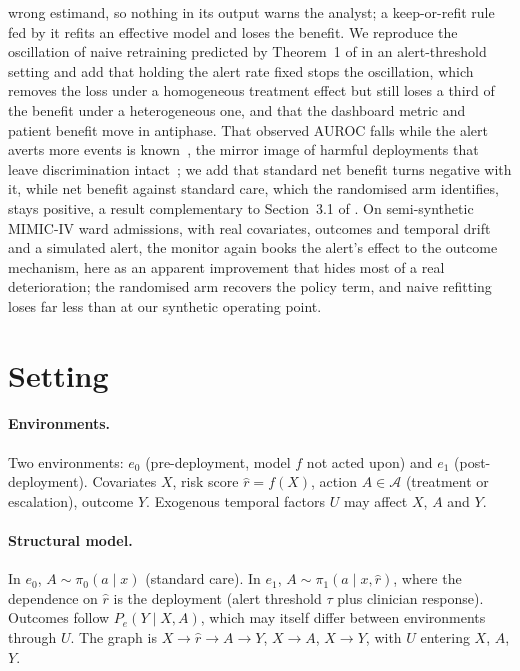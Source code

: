 \documentclass[letterpaper]{article} %
\newcommand{\rhat}{\hat r}
\begin{document}
wrong estimand, so nothing in its output warns the analyst; a keep-or-refit
rule fed by it refits an effective model and loses the benefit. We reproduce the oscillation of naive retraining predicted by
Theorem~1 of \citet{liley2021model} in an alert-threshold setting and add that
holding the alert rate fixed stops the oscillation, which removes the loss
under a homogeneous treatment effect but still loses a third of the benefit
under a heterogeneous one, and that the dashboard metric and patient
benefit move in antiphase. That observed AUROC falls while the alert averts
more events is known~\citep{pajouheshnia2017accounting, ansari2025challenges},
the mirror image of harmful deployments that leave discrimination
intact~\citep{vanamsterdam2025selffulfilling}; we add that standard net benefit
turns negative with it, while net benefit against standard care, which the
randomised arm identifies, stays positive, a result complementary to
Section~3.1 of \citet{liley2021model}. On semi-synthetic MIMIC-IV ward
admissions, with real covariates, outcomes and temporal drift and a simulated
alert, the monitor again books the alert's effect to the outcome mechanism,
here as an apparent improvement that hides most of a real deterioration; the
randomised arm recovers the policy term, and naive refitting loses far less
than at our synthetic operating point.

\section{Setting}
\label{sec:setting}

\paragraph{Environments.} Two environments: $e_0$ (pre-deployment, model $f$
not acted upon) and $e_1$ (post-deployment). Covariates $X$, risk score
$\rhat = f(X)$, action $A \in \mathcal{A}$ (treatment or escalation), outcome
$Y$. Exogenous temporal factors $U$ may affect $X$, $A$ and $Y$.

\paragraph{Structural model.} In $e_0$, $A \sim \pi_0(a \mid x)$ (standard
care). In $e_1$, $A \sim \pi_1(a \mid x, \rhat)$, where the dependence on
$\rhat$ is the deployment (alert threshold $\tau$ plus clinician response).
Outcomes follow $P_e(Y \mid X, A)$, which may itself differ between
environments through $U$. The graph is
$X \to \rhat \to A \to Y$, $X \to A$, $X \to Y$, with $U$ entering $X$, $A$,
$Y$.
\end{document}
